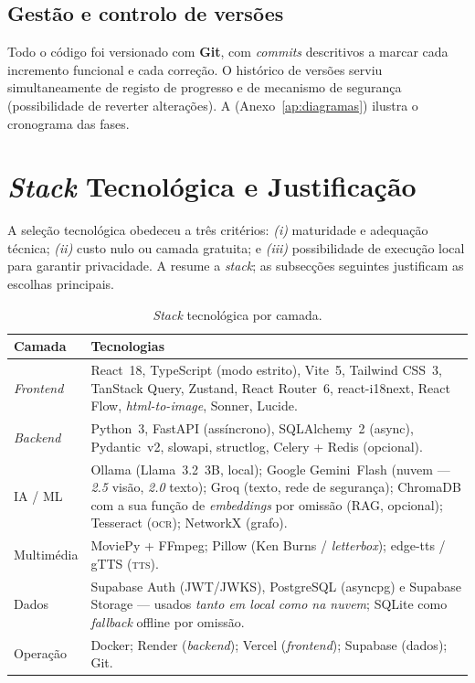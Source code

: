 \subsection{Gestão e controlo de versões}

Todo o código foi versionado com \textbf{Git}, com \emph{commits}
descritivos a marcar cada incremento funcional e cada correção. O
histórico de versões serviu simultaneamente de registo de progresso e de
mecanismo de segurança (possibilidade de reverter alterações). A
 (Anexo~\ref{ap:diagramas}) ilustra o cronograma das
fases.

\section{\emph{Stack} Tecnológica e Justificação}
\label{sec:stack}

A seleção tecnológica obedeceu a três critérios: \emph{(i)} maturidade e
adequação técnica; \emph{(ii)} custo nulo ou camada gratuita; e
\emph{(iii)} possibilidade de execução local para garantir privacidade.
A  resume a \emph{stack}; as subsecções seguintes
justificam as escolhas principais.

\begin{table}[H]
\centering
\caption{\emph{Stack} tecnológica por camada.}
\label{tab:stack}
\small
\begin{tabularx}{\linewidth}{@{}p{3cm}Y@{}}
\toprule
\textbf{Camada} & \textbf{Tecnologias} \\
\midrule
\emph{Frontend} & React~18, TypeScript (modo estrito), Vite~5, Tailwind
CSS~3, TanStack Query, Zustand, React Router~6, react-i18next, React Flow,
\emph{html-to-image}, Sonner, Lucide. \\
\emph{Backend} & Python~3, FastAPI (assíncrono), SQLAlchemy~2 (async),
Pydantic~v2, slowapi, structlog, Celery + Redis (opcional). \\
IA / ML & Ollama (Llama~3.2~3B, local); Google Gemini~Flash (nuvem ---
\emph{2.5} visão, \emph{2.0} texto); Groq (texto, rede de segurança);
ChromaDB com a sua função de \emph{embeddings} por omissão (RAG, opcional);
Tesseract (\textsc{ocr}); NetworkX (grafo). \\
Multimédia & MoviePy + FFmpeg; Pillow (Ken Burns / \emph{letterbox});
edge-tts / gTTS (\textsc{tts}). \\
Dados & Supabase Auth (JWT/JWKS), PostgreSQL (asyncpg) e Supabase Storage
--- usados \emph{tanto em local como na nuvem}; SQLite como \emph{fallback}
offline por omissão. \\
Operação & Docker; Render (\emph{backend}); Vercel (\emph{frontend});
Supabase (dados); Git. \\
\bottomrule
\end{tabularx}
\end{table}

